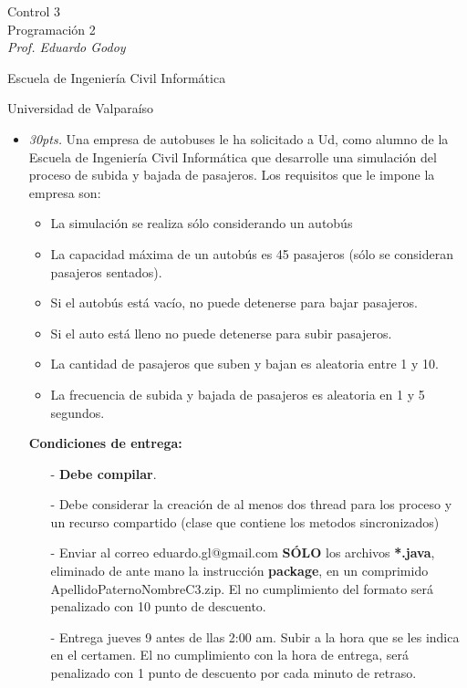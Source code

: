 \documentclass{article}
\begin{document}
\begin{center}
	{\Large Control 3}\\
	Programaci\'on 2 \\
	\emph{\small Prof. Eduardo Godoy} \\
\end{center}
	\centerline{\sc \normalsize Escuela de Ingenier\'ia Civil Inform\'atica}
	\centerline{\sc \normalsize  Universidad de Valpara\'iso}

	\vspace{1pc}

\begin{itemize}
  \item \emph{30pts.} Una empresa de autobuses le ha solicitado a Ud, como alumno de la Escuela de Ingenier\'ia Civil Inform\'atica que desarrolle una simulaci\'on del proceso de subida y bajada de pasajeros. Los requisitos que le impone la empresa son:

  \begin{itemize}
      \item La simulaci\'on se realiza s\'olo considerando un autob\'us
      \item La capacidad m\'axima de un autob\'us es 45 pasajeros (s\'olo se consideran pasajeros sentados).
      \item Si el autob\'us est\'a vac\'io, no puede detenerse para bajar pasajeros.
      \item Si el auto est\'a lleno no puede detenerse para subir pasajeros.
      \item La cantidad de pasajeros que suben y bajan es aleatoria entre 1 y 10.
      \item La frecuencia de subida y bajada de pasajeros es aleatoria en 1 y 5 segundos.
  \end{itemize}

  \textbf{Condiciones de entrega:}
  \begin{itemize}
      \item[-] \textbf{Debe compilar}.
      \item[-] Debe considerar la creaci\'on de al menos dos thread para los proceso y un recurso compartido (clase que contiene los metodos sincronizados)
      \item[-] Enviar al correo eduardo.gl@gmail.com \textbf{S\'OLO} los archivos \textbf{*.java}, eliminado de ante mano la instrucci\'on \textbf{package}, en un comprimido ApellidoPaternoNombreC3.zip. El no cumplimiento del formato ser\'a penalizado con 10 punto de descuento.
      \item[-] Entrega jueves 9 antes de llas 2:00 am. Subir a la hora que se les indica en el certamen. El no cumplimiento con la hora de entrega, ser\'a penalizado con 1 punto de descuento por cada minuto de retraso.
  \end{itemize}
\end{itemize}
\end{document}
